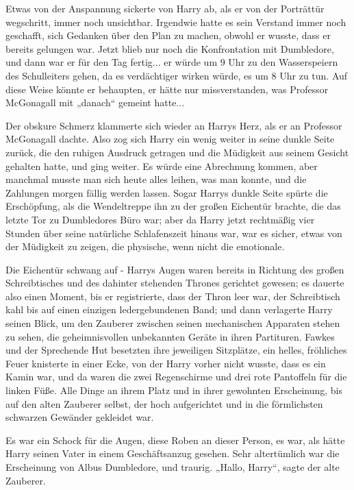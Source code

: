 {Etwas von der Anspannung sickerte von Harry ab, als er von der Porträttür wegschritt, immer noch unsichtbar. Irgendwie hatte es sein Verstand immer noch geschafft, sich Gedanken über den Plan zu machen, obwohl er wusste, dass er bereits gelungen war. Jetzt blieb nur noch die Konfrontation mit Dumbledore, und dann war er für den Tag fertig... er würde um 9 Uhr zu den Wasserspeiern des Schulleiters gehen, da es verdächtiger wirken würde, es um 8 Uhr zu tun. Auf diese Weise könnte er behaupten, er hätte nur missverstanden, was Professor McGonagall mit „danach“ gemeint hatte...

Der obskure Schmerz klammerte sich wieder an Harrys Herz, als er an Professor McGonagall dachte. Also zog sich Harry ein wenig weiter in seine dunkle Seite zurück, die den ruhigen Ausdruck getragen und die Müdigkeit aus seinem Gesicht gehalten hatte, und ging weiter. Es würde eine Abrechnung kommen, aber manchmal musste man sich heute alles leihen, was man konnte, und die Zahlungen morgen fällig werden lassen. Sogar Harrys dunkle Seite spürte die Erschöpfung, als die Wendeltreppe ihn zu der großen Eichentür brachte, die das letzte Tor zu Dumbledores Büro war; aber da Harry jetzt rechtmäßig vier Stunden über seine natürliche Schlafenszeit hinaus war, war es sicher, etwas von der Müdigkeit zu zeigen, die physische, wenn nicht die emotionale.

Die Eichentür schwang auf - Harrys Augen waren bereits in Richtung des großen Schreibtisches und des dahinter stehenden Thrones gerichtet gewesen; es dauerte also einen Moment, bis er registrierte, dass der Thron leer war, der Schreibtisch kahl bis auf einen einzigen ledergebundenen Band; und dann verlagerte Harry seinen Blick, um den Zauberer zwischen seinen mechanischen Apparaten stehen zu sehen, die geheimnisvollen unbekannten Geräte in ihren Partituren. Fawkes und der Sprechende Hut besetzten ihre jeweiligen Sitzplätze, ein helles, fröhliches Feuer knisterte in einer Ecke, von der Harry vorher nicht wusste, dass es ein Kamin war, und da waren die zwei Regenschirme und drei rote Pantoffeln für die linken Füße. Alle Dinge an ihrem Platz und in ihrer gewohnten Erscheinung, bis auf den alten Zauberer selbst, der hoch aufgerichtet und in die förmlichsten schwarzen Gewänder gekleidet war.

Es war ein Schock für die Augen, diese Roben an dieser Person, es war, als hätte Harry seinen Vater in einem Geschäftsanzug gesehen. Sehr altertümlich war die Erscheinung von Albus Dumbledore, und traurig. „Hallo, Harry“, sagte der alte Zauberer.

}
